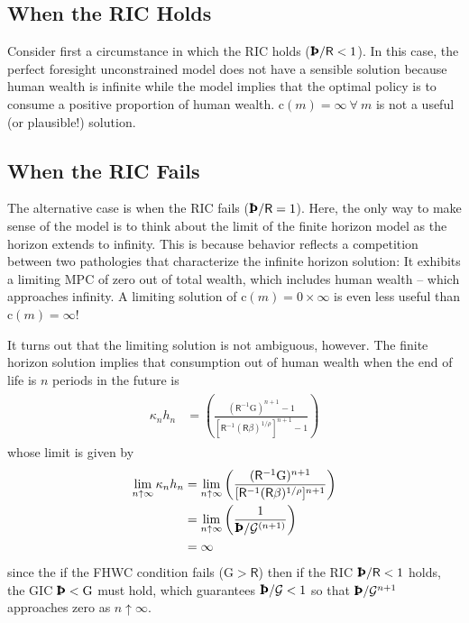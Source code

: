 \documentclass{scrartcl}
\begin{document}
\subsection{When the RIC Holds}
Consider first a circumstance in which the RIC holds ($\text{\pmb{\Thorn}}/{\mathsf{R}}<1$).
In this case, the perfect foresight unconstrained model does not have a sensible solution because human wealth is infinite while the model implies that the optimal policy is to consume a positive proportion of human wealth.
$\mathrm{c}(m)=\infty~\forall~m$ is not a useful (or plausible!) solution.

\subsection{When the RIC Fails}
The alternative case is when the RIC fails ($\text{\pmb{\Thorn}}/{\mathsf{R}}=1$).
Here, the only way to make sense of the model is to think about the limit of the finite horizon model as the horizon extends to infinity.
This is because behavior reflects a competition between two pathologies that characterize the infinite horizon solution:  It exhibits a limiting MPC of zero out of total wealth, which includes human wealth -- which approaches infinity.
A limiting solution of $\mathrm{c}(m) = 0 \times \infty$ is even less useful than $\mathrm{c}(m) = \infty$!


It turns out that the limiting solution is not ambiguous, however.
The finite horizon solution implies that consumption out of human wealth when the end of life is $n$ periods in the future is 
\begin{equation}\begin{gathered}\begin{aligned}
  \kappa_{n} h_{n} & =  \left(\frac{(\mathsf{R}^{-1}{\ensuremath{\mathrm{G}}})^{{n}+1}-1}{[\mathsf{R}^{-1}(\mathsf{R}\beta)^{1/\rho}]^{{n}+1}-1}\right) 
\end{aligned}\end{gathered}\end{equation}
whose limit is given by 
\begin{equation}\begin{gathered}\begin{aligned}
\lim_{{n} \uparrow \infty} \kappa_{n} h_{n} & =  \lim_{n \uparrow \infty} \left(\frac{(\mathsf{R}^{-1}{\ensuremath{\mathrm{G}}})^{{n}+1}}{[\mathsf{R}^{-1}(\mathsf{R}\beta)^{1/\rho}]^{{n}+1}}\right)
\\ & =  \lim_{n \uparrow \infty} \left(\frac{1}{\text{\pmb{\Thorn}}/{\mathcal{G}}^{(n+1)}}\right)
\\ & =  \infty
\end{aligned}\end{gathered}\end{equation}
since the if the FHWC condition fails ($\ensuremath{\mathrm{G}} > \mathsf{R}$) then if the RIC $\text{\pmb{\Thorn}}/\mathsf{R} < 1$ holds, the GIC $\text{\pmb{\Thorn}} < \ensuremath{\mathrm{G}}$ must hold, which guarantees $\text{\pmb{\Thorn}}/{\mathcal{G}} < 1$ so that $\text{\pmb{\Thorn}}/{\mathcal{G}}^{n+1}$ approaches zero as $n \uparrow \infty.$
\end{document}

